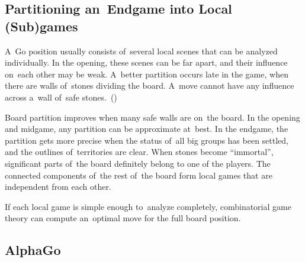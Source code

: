 \subsection{Partitioning an~Endgame into Local (Sub)games}

A~Go position usually consists of~several local scenes that can be analyzed individually.
In the opening, these scenes can be far apart, and their influence on~each other may be weak.
A~better partition occurs late in the game, when there are walls of~stones dividing the board.
A~move cannot have any influence across a~wall of~safe stones.~(\cite{Muller1995computer})

Board partition improves when many safe walls are on~the board.
In the opening and midgame, any partition can be approximate at~best.
In the endgame, the partition gets more precise when the status of~all big groups has been settled, and the outlines of~territories are clear.
When stones become ``immortal'', significant parts of~the board definitely belong to one of the players.
The connected components of~the rest of~the board form local games that are independent from each other.

If each local game is simple enough to~analyze completely, combinatorial game theory can compute an~optimal move for the full board position.

\subsection{AlphaGo}
\todo

